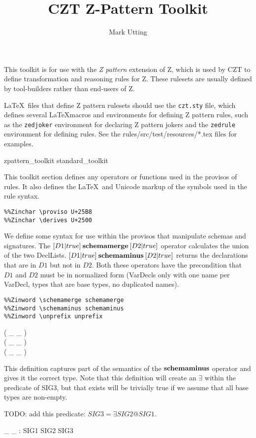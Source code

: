 \documentclass[10pt]{article}
\title{CZT Z-Pattern Toolkit}
\author{Mark Utting}
\begin{document}
\maketitle

This toolkit is for use with the \emph{Z pattern} extension of Z,
which is used by CZT to define transformation and reasoning rules
for Z.  These rulesets are usually defined by tool-builders rather
than end-users of Z.

\LaTeX\ files that define Z pattern rulesets should use the
\verb!czt.sty! file, which defines several \LaTeX macros and
environments for defining Z pattern rules, such as 
the \verb!zedjoker! environment for declaring
Z pattern jokers and the \verb!zedrule! environment for defining
rules.  See the rules/src/test/resources/*.tex files for examples.

\begin{zsection}
  \SECTION zpattern\_toolkit \parents standard\_toolkit
\end{zsection}

This toolkit section defines any operators or functions used in the
provisos of rules.  It also defines the \LaTeX\ and Unicode markup of
the symbols used in the rule syntax.

\begin{verbatim}
%%Zinchar \proviso U+25B8
%%Zinchar \derives U+2500
\end{verbatim}

We define some syntax for use within the provisos that manipulate
schemas and signatures.  The $[D1|true] \mathbin{\textbf{schemamerge}} [D2|true]$
operator calculates the union of the two DeclLists. 
$[D1|true] \mathbin{\textbf{schemaminus}} [D2|true]$ returns the declarations that are in
$D1$ but not in $D2$.  Both these operators have the precondition that
$D1$ and $D2$ must be in normalized form (VarDecls only with one name
per VarDecl, types that are base types, no duplicated names).

\begin{verbatim}
%%Zinword \schemamerge schemamerge
%%Zinword \schemaminus schemaminus
%%Zinword \unprefix unprefix
\end{verbatim}

\begin{zed}
   \leftassoc ( \_ \schemamerge \_ ) \\
   \leftassoc ( \_ \schemaminus \_ ) \\
   \leftassoc ( \_ \unprefix \_ )
\end{zed}


This definition captures part of the semantics of
the $\mathbin{\textbf{schemaminus}}$ operator and gives it the correct
type.  Note that this definition will create an $\exists$
within the predicate of SIG3, but that exists will be
trivially true if we assume that all base types are non-empty. 

TODO: add this predicate: $SIG3 = \exists SIG2 @ SIG1$.

\begin{gendef}
  \_ \schemaminus \_ : SIG1 \cross SIG2 \fun SIG3
\end{gendef}
\end{document}
